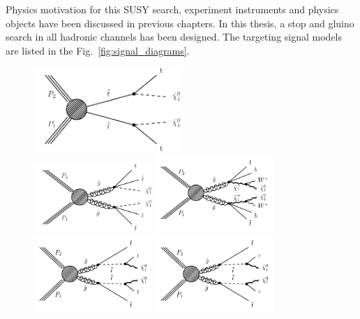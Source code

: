 Physics motivation for this SUSY search, experiment instruments and physics objects have been discussed in previous chapters. In this thesis, a stop and gluino search in all hadronic channels has been designed. The targeting signal models are listed in the Fig.~\ref{fig:signal_diagrams}.

\begin{figure}[ht!]
\begin{centering}
\includegraphics[width=0.50\textwidth]{sections/mc4/Introduction/figures/T2tt.pdf}\\
\includegraphics[width=0.40\textwidth]{sections/mc4/Introduction/figures/T1tttt_feynman.pdf}
\includegraphics[width=0.40\textwidth]{sections/mc4/Introduction/figures/T1ttbb.pdf}\\
\includegraphics[width=0.40\textwidth]{sections/mc4/Introduction/figures/T5tttt.pdf}
\includegraphics[width=0.40\textwidth]{sections/mc4/Introduction/figures/T5ttcc.pdf}\\

\end{centering}
\end{figure}
